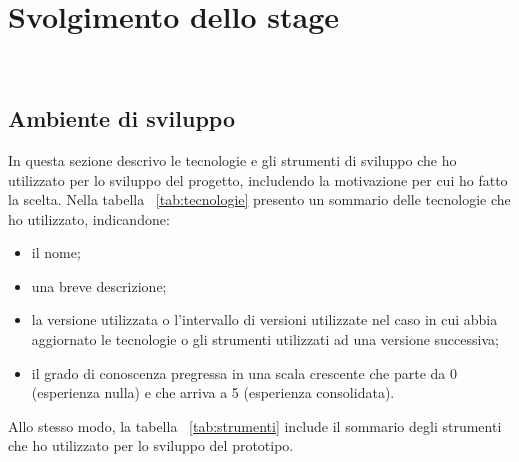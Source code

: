 
\pagebreak
\chapter{Svolgimento dello stage}
\label{cap:descrizione-stage}

\\

\section{Ambiente di sviluppo}

In questa sezione descrivo le tecnologie e gli strumenti di sviluppo che ho utilizzato per lo sviluppo del progetto, includendo la motivazione per cui ho fatto la scelta.
Nella tabella ~\ref{tab:tecnologie} presento un sommario delle tecnologie che ho utilizzato, indicandone:
\begin{itemize}
  \item il nome;
  \item una breve descrizione;
  \item la versione utilizzata o l'intervallo di versioni utilizzate nel caso in cui abbia aggiornato le tecnologie o gli strumenti utilizzati ad una versione successiva;
  \item il grado di conoscenza pregressa in una scala crescente che parte da 0 (esperienza nulla) e che arriva a 5 (esperienza consolidata).
\end{itemize}
Allo stesso modo, la tabella ~\ref{tab:strumenti} include il sommario degli strumenti che ho utilizzato per lo sviluppo del prototipo.

